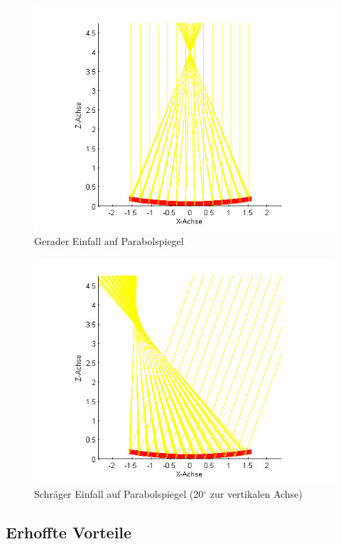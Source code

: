 \documentclass[fontsize=10pt,paper=a4,bibliography=totoc]{scrartcl}
\begin{document}
\begin{figure}[htb]
	\centering
	\includegraphics[width=\textwidth]{images/2d_gerade}
	\caption{Gerader Einfall auf Parabolspiegel}
	\label{pic:2dreflektion}
\end{figure}
\begin{figure}[htb]
	\centering
	\includegraphics[width=\textwidth]{images/2d_schraeg_20_grad}
	\caption{Schräger Einfall auf Parabolspiegel (20$^{\circ}$ zur vertikalen Achse)}
	\label{pic:2dreflektion_schraeg}
\end{figure}

\subsection{Erhoffte Vorteile}
\end{document}
